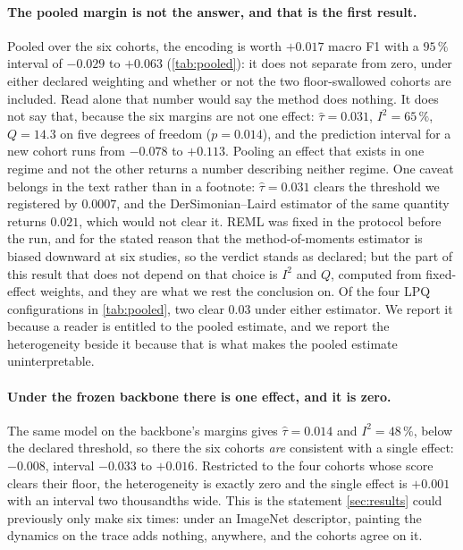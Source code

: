 \documentclass[10pt,a4paper]{article}
\begin{document}



\paragraph{The pooled margin is not the answer, and that is the first result.} Pooled over the six
cohorts, the encoding is worth $+0.017$ macro F1 with a $95\,\%$ interval of $-0.029$ to $+0.063$
(\cref{tab:pooled}): it does not separate from zero, under either declared weighting and whether or
not the two floor-swallowed cohorts are included. Read alone that number would say the method does
nothing. It does not say that, because the six margins are not one effect: $\hat\tau = 0.031$,
$I^2 = 65\,\%$, $Q = 14.3$ on five degrees of freedom ($p = 0.014$), and the prediction interval for
a new cohort runs from $-0.078$ to $+0.113$. Pooling an effect that exists in one regime and not the
other returns a number describing neither regime. One caveat belongs in the text rather than in a
footnote: $\hat\tau = 0.031$ clears the threshold we registered by $0.0007$, and the
DerSimonian--Laird estimator of the same quantity returns $0.021$, which would not clear it. REML
was fixed in the protocol before the run, and for the stated reason that the method-of-moments
estimator is biased downward at six studies, so the verdict stands as declared; but the part of
this result that does not depend on that choice is $I^2$ and $Q$, computed from fixed-effect
weights, and they are what we rest the conclusion on. Of the four LPQ configurations in
\cref{tab:pooled}, two clear $0.03$ under either estimator. We report it because a reader is entitled to the
pooled estimate, and we report the heterogeneity beside it because that is what makes the pooled
estimate uninterpretable.

\paragraph{Under the frozen backbone there is one effect, and it is zero.} The same model on the
backbone's margins gives $\hat\tau = 0.014$ and $I^2 = 48\,\%$, below the declared threshold, so
there the six cohorts \emph{are} consistent with a single effect: $-0.008$, interval $-0.033$ to
$+0.016$. Restricted to the four cohorts whose score clears their floor, the heterogeneity is
exactly zero and the single effect is $+0.001$ with an interval two thousandths wide. This is the
statement \cref{sec:results} could previously only make six times: under an ImageNet descriptor,
painting the dynamics on the trace adds nothing, anywhere, and the cohorts agree on it.
\end{document}
